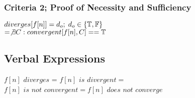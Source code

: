 \documentclass[11pt]{article}
\begin{document}
\subsubsection{Criteria 2; Proof of Necessity and Sufficiency}
\begin{center}
$
diverges \lbrack f \lbrack n \rbrack \rbrack = d_o; \hspace{1mm} d_o \in \{\mathbb{T},\mathbb{F}\}
$
\\ \vspace{4mm}
$
= \not \exists C : convergent[f[n],C] == \mathbb{T}
$
\end{center}






\subsection{Verbal Expressions}
\begin{center}
\vspace{1mm}
$
f[n]$ $diverges$ = $f[n]$ $is$ $divergent =
$
\\ \vspace{2mm}
$
f[n]$ $is$ $not$ $convergent= f[n]$ $does$ $not$ $converge
$
\end{center}




















\end{document}

